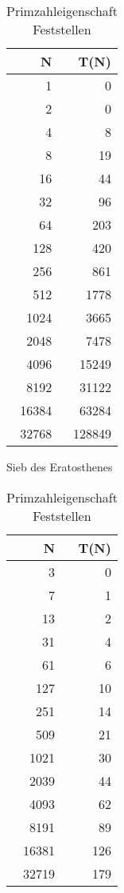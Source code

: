 \documentclass[paper=a4, fontsize=11pt]{scrartcl} %
\numberwithin{equation}{section} %
\numberwithin{figure}{section} %
\numberwithin{table}{section} %
\begin{document}
\begin{table}[h!]
{\begin{tabular}{ r | r }
      N & T(N) \\
      \hline
      1 & 0 \\
      2 & 0 \\
      4 & 8 \\
      8 & 19 \\
      16 & 44 \\
      32 & 96 \\
      64 & 203 \\
      128 & 420 \\
      256 & 861 \\
      512 & 1778 \\
      1024 & 3665 \\
      2048 & 7478 \\
      4096 & 15249 \\
      8192 & 31122 \\
      16384 & 63284 \\
      32768 & 128849 \\
    \end{tabular}
    \caption{Sieb des Eratosthenes}
    \label{table:3}
  }
  \parbox{.5\linewidth}{
    \centering
    \begin{tabular}{ r | r }
      N & T(N) \\
      \hline
      3 & 0 \\
      7 & 1 \\
      13 & 2 \\
      31 & 4 \\
      61 & 6 \\
      127 & 10 \\
      251 & 14 \\
      509 & 21 \\
      1021 & 30 \\
      2039 & 44 \\
      4093 & 62 \\
      8191 & 89 \\
      16381 & 126 \\
      32719 & 179 \\
    \end{tabular}
    \caption{Primzahleigenschaft Feststellen}
    \label{table:4}
  }
\end{table}


\end{document}
